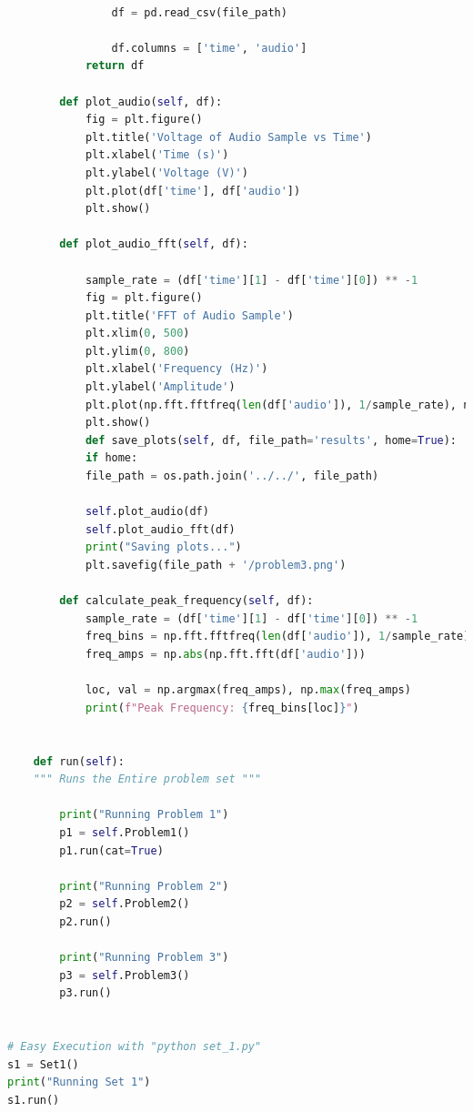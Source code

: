 \documentclass[]{report}
\begin{document}
\begin{lstlisting}[language=Python]
				
				df = pd.read_csv(file_path)
				
				df.columns = ['time', 'audio']
			return df
		
		def plot_audio(self, df):
			fig = plt.figure()
			plt.title('Voltage of Audio Sample vs Time')
			plt.xlabel('Time (s)')
			plt.ylabel('Voltage (V)')
			plt.plot(df['time'], df['audio'])
			plt.show()
		
		def plot_audio_fft(self, df):
		
			sample_rate = (df['time'][1] - df['time'][0]) ** -1            
			fig = plt.figure()
			plt.title('FFT of Audio Sample')
			plt.xlim(0, 500) 
			plt.ylim(0, 800)
			plt.xlabel('Frequency (Hz)')
			plt.ylabel('Amplitude')
			plt.plot(np.fft.fftfreq(len(df['audio']), 1/sample_rate), np.abs(np.fft.fft(df['audio'])))
			plt.show()            
			def save_plots(self, df, file_path='results', home=True):
			if home:
			file_path = os.path.join('../../', file_path)
			
			self.plot_audio(df)
			self.plot_audio_fft(df)
			print("Saving plots...")
			plt.savefig(file_path + '/problem3.png')
		
		def calculate_peak_frequency(self, df):
			sample_rate = (df['time'][1] - df['time'][0]) ** -1  
			freq_bins = np.fft.fftfreq(len(df['audio']), 1/sample_rate)
			freq_amps = np.abs(np.fft.fft(df['audio']))
		
			loc, val = np.argmax(freq_amps), np.max(freq_amps)
			print(f"Peak Frequency: {freq_bins[loc]}")
	
	
	def run(self):
	""" Runs the Entire problem set """
	
		print("Running Problem 1")
		p1 = self.Problem1()
		p1.run(cat=True)
		
		print("Running Problem 2")
		p2 = self.Problem2()
		p2.run()
		
		print("Running Problem 3")
		p3 = self.Problem3()
		p3.run()
	
	
# Easy Execution with "python set_1.py"
s1 = Set1()
print("Running Set 1")
s1.run()




\end{lstlisting}
\end{document}
